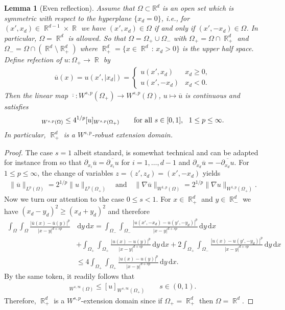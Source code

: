 \documentclass[12pt, reqno]{amsart}%
\theoremstyle{plain}  %
\newtheorem{lemma}[theorem]{Lemma}
\theoremstyle{definition}  %
\theoremstyle{remark}
\numberwithin{equation}{section}
\DeclareMathOperator{\R}{\mathbb{R}}
\renewcommand{\d}{\,\mathrm{d}}
\begin{document}
\begin{lemma}[Even reflection] \label{lem:even-reflec}
Assume that $\Omega \subset \mathbb{R}^d$ is an open set which is symmetric with respect to the hyperplane $\{x_d = 0\}$, i.e., for $(x', x_d)\in \R^{d-1}\times \R$  we have  $(x', x_d)\in \Omega$ if and only if $(x',-x_d)\in \Omega$.
In particular, $\Omega = \R^d$ is allowed. So that  $\Omega=\Omega_+\cup\Omega_-$ with  $\Omega_+=\Omega \cap \R^d_+$ and $\Omega_-= \Omega \cap (\R^d\setminus \R^d_+)$ where $\R^d_+=\{x\in \R^d\,:\, x_d>0\}$  is the upper half space.   Define refection of $u:\Omega_+\to\R$ by
\begin{align*}
\overline{u}(x)=u(x',|x_d|)=
\begin{cases}
u(x',x_d)&x_d\geq 0,\\
u(x',-x_d) &x_d<0.
\end{cases}
\end{align*}
Then the linear map  $\overline{\cdot}:W^{s,p}(\Omega_+)\to W^{s,p}(\Omega)$, $u\mapsto \overline{u}$  is continuous and satisfies
\begin{align*}
[\overline{u}]_{W^{s,p}(\Omega)} \leq
4^{1/p}[u]_{W^{s,p}(\Omega_+)}\qquad \text{for all $s\in [0,1]$,\,\,\, $1\leq p\leq \infty$}.
\end{align*}
In particular, $\R^d_+$ is a $W^{s,p}$-robust extension domain.
\end{lemma}

\begin{proof}
The case $s=1$ albeit standard, is somewhat technical and can be adapted for instance from \cite[Lemm 9.2]{Bre10} so  that $\partial_{x_i} \overline{u} = \overline{\partial_{x_i} u}$ for $i = 1,\dots,d-1$ and $\partial_{x_d} \overline{u} = -\overline{\partial_{x_d} u}$. For $1\leq p\leq \infty$, the  change of variables $z=(z',z_d)= (x',-x_d)$ yields
\begin{align*}
\|\overline{u}\|_{L^p(\Omega)}
= 2^{1/p} \|u\|_{L^p(\Omega_+)}\quad \text{and}\quad
\|\nabla \overline{u}\|_{W^{1,p}(\Omega)}
= 2^{1/p}\|\nabla u\|_{W^{1,p}(\Omega_+)}.
\end{align*}
Now we turn our attention to the case $0\leq s<1$. For $x\in \R^d_+$ and $y\in\R^d_-$ we have  $(x_d-y_d)^2\geq (x_d+y_d)^2 $ and therefore
\begin{align*}
\int_{\Omega}\int_{\Omega} \frac{|\overline{u}(x)-\overline{u}(y)|^p}{|x-y|^{d+sp}} &\d y\d x
=  \int_{ \Omega_-}\int_{ \Omega_-} \frac{|u(x',-x_d)-u(y',-y_d)|^p}{|x-y|^{d+sp}} \d y\d x\\
&+\int_{\Omega_+}\int_{\Omega_+} \frac{|u(x)-u(y)|^p}{|x-y|^{d+sp}} \d y \d x+ 2\int_{\Omega_+}\int_{ \Omega_-} \frac{|u(x)-u(y',-y_d)|^p}{|x-y|^{d+sp}} \d y\d x \\
& \leq  4\int_{\Omega_+}\int_{\Omega_+} \frac{|u(x)-u(y)|^p}{|x-y|^{d+sp}} \d y \d x.
\end{align*}
By the same token,  it readily follows that
\begin{align*}
[\overline{u}] _{W^{s,\infty}(\Omega)} \leq  [u]_{W^{s,\infty}(\Omega_+)}\qquad s\in (0,1).
\end{align*}
 Therefore, $\R^d_+$ is a $W^{s,p}$-extension domain since  if $\Omega_+=\R^d_+$ then $\Omega=\R^d$.
\end{proof}
\end{document}
